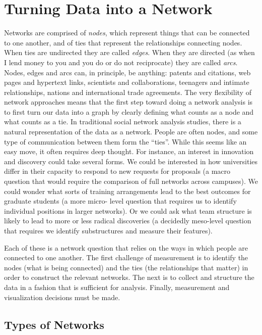 \documentclass[]{krantz}
\begin{document}
\section{Turning Data into a Network}\label{turning-data-into-a-network}

Networks are comprised of \emph{nodes}, which represent things that can
be connected to one another, and of ties that represent the
relationships connecting nodes. When ties are undirected they are called
\emph{edges}. When they are directed (as when I lend money to you and
you do or do not reciprocate) they are called \emph{arcs}. Nodes, edges
and arcs can, in principle, be anything: patents and citations, web
pages and hypertext links, scientists and collaborations, teenagers and
intimate relationships, nations and international trade agreements. The
very flexibility of network approaches means that the first step toward
doing a network analysis is to first turn our data into a graph by
clearly defining what counts as a node and what counts as a tie. In
traditional social network analysis studies, there is a natural
representation of the data as a network. People are often nodes, and
some type of communication between them form the ``ties''. While this
seems like an easy move, it often requires deep thought. For instance,
an interest in innovation and discovery could take several forms. We
could be interested in how universities differ in their capacity to
respond to new requests for proposals (a macro question that would
require the comparison of full networks across campuses). We could
wonder what sorts of training arrangements lead to the best outcomes for
graduate students (a more micro- level question that requires us to
identify individual positions in larger networks). Or we could ask what
team structure is likely to lead to more or less radical discoveries (a
decidedly meso-level question that requires we identify substructures
and measure their features).

Each of these is a network question that relies on the ways in which
people are connected to one another. The first challenge of measurement
is to identify the nodes (what is being connected) and the ties (the
relationships that matter) in order to construct the relevant networks.
The next is to collect and structure the data in a fashion that is
sufficient for analysis. Finally, measurement and visualization
decisions must be made.

\subsection{Types of Networks}\label{types-of-networks}
\end{document}
